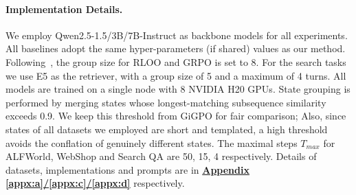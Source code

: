 \documentclass{llmxive}
\providecommand{\arraystretch}{1}
\begin{document}
\paragraph{Implementation Details.}
We employ Qwen2.5-1.5/3B/7B-Instruct as backbone models for all experiments. All baselines adopt the same hyper-parameters (if shared) values as our method. Following~\cite{feng2025group}, the group size for RLOO and GRPO is set to 8. For the search tasks we use E5 as the retriever, with a group size of 5 and a maximum of 4 turns. All models are trained on a single node with 8 NVIDIA H20 GPUs. State grouping is performed by merging states whose longest-matching subsequence similarity exceeds 0.9. We keep this threshold from GiGPO for fair comparison; Also, since states of all datasets we employed are short and templated, a high threshold  avoids the conflation of genuinely different states. The maximal steps $T_{max}$ for ALFWorld, WebShop and Search QA are 50, 15, 4 respectively. Details of datasets, implementations and prompts are in \textbf{\underline{Appendix \ref{appx:a}/\ref{appx:c}/\ref{appx:d}}} respectively.


\begin{table}[t]
\begin{center} 
\vspace{-0.2cm}
\renewcommand{\arraystretch}{1}   
\setlength\tabcolsep{11pt} 
\vspace{-0.2cm}
\caption{Comparison on search-augmented QA tasks. Role-Agent is trained on NQ and HotpotQA. $\dagger$ and $*$ indicate in-domain and out-of-domain datasets, respectively. All methods are experimented with Qwen2.5-3B-Instruct.}\label{tab:2} 
\vspace{-0.6cm}
\end{center}
\end{table}
\end{document}
